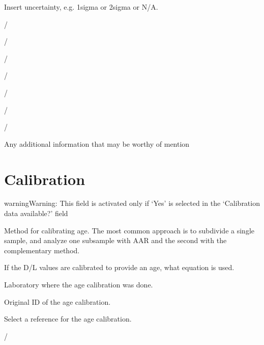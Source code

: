 \documentclass[letterpaper,10pt,english]{sphinxmanual}
\begin{document}
 \sphinxhyphen{} Insert uncertainty, e.g. 1\sphinxhyphen{}sigma or 2\sphinxhyphen{}sigma or N/A.


 / 

 / 

 / 

 / 

 / 

 / 

 / 

 \sphinxhyphen{} Any additional information that may be worthy of mention


\section{Calibration}
\label{\detokenize{AAR:calibration}}
\begin{sphinxadmonition}{warning}{Warning:}
This field is activated only if ‘Yes’ is selected in the ‘Calibration data available?’ field
\end{sphinxadmonition}

 \sphinxhyphen{} Method for calibrating age. The most common approach is to subdivide a single sample, and analyze one subsample with AAR and the second with the complementary method.

 \sphinxhyphen{} If the D/L values are calibrated to provide an age, what equation is used.

 \sphinxhyphen{} Laboratory where the age calibration was done.

 \sphinxhyphen{} Original ID of the age calibration.

 \sphinxhyphen{} Select a reference for the age calibration.

 / 
\end{document}
